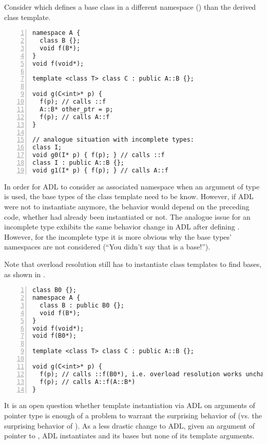 Consider  which defines a base class in a different namespace 
() than the derived class template.
\begin{lstlisting}[style=Vc,numbers=left,float,label=lst:baseNamespace,caption={
ADL in namespace of base class
}]
namespace A {
  class B {};
  void f(B*);
}
void f(void*);

template <class T> class C : public A::B {};

void g(C<int>* p) {
  f(p); // calls ::f
  A::B* other_ptr = p;
  f(p); // calls A::f
}

// analogue situation with incomplete types:
class I;
void g0(I* p) { f(p); } // calls ::f
class I : public A::B {};
void g1(I* p) { f(p); } // calls A::f
\end{lstlisting}
In order for ADL to consider  as associated namespace when an argument of type 
 is used, the base types of the class template need to be know. However, if 
ADL were not to instantiate  anymore, the behavior would depend on the 
preceding code, whether  had already been instantiated or not. The analogue 
issue for an incomplete type  exhibits the same behavior change in ADL after 
defining . However, for the incomplete type it is more obvious why the base types' 
namespaces are not considered (“You didn't say that  is a base!”).

Note that overload resolution still has to instantiate class templates to find bases, as 
shown in .
\begin{lstlisting}[style=Vc,numbers=left,float,label=lst:instantiateOverloadResolution,caption={
Class template instantiation on overload resolution
}]
class B0 {};
namespace A {
  class B : public B0 {};
  void f(B*);
}
void f(void*);
void f(B0*);

template <class T> class C : public A::B {};

void g(C<int>* p) {
  f(p); // calls ::f(B0*), i.e. overload resolution works unchanged
  f(p); // calls A::f(A::B*)
}
\end{lstlisting}
It is an open question whether template instantiation via ADL on arguments of pointer type 
is enough of a problem to warrant the surprising behavior of 
 (vs. the surprising behavior of ). As a 
less drastic change to ADL, given an argument of pointer to , ADL instantiates 
 and its bases but none of its template arguments.

